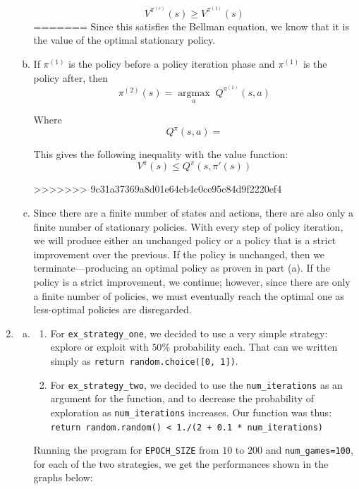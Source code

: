 \documentclass{article}
\begin{document}
\begin{enumerate}
\begin{enumerate}[(a)]
 $$V^{\pi^{(e)}}(s) \geq V^{\pi^{(1)}}(s)$$  
=======
                Since this satisfies the Bellman equation, we know that it is the value of the optimal stationary policy.
                
                \item If $\pi^{(1)}$ is the policy before a policy iteration phase and $\pi^{(1)}$ is the policy after, then $$\pi^{(2)}(s) = \underset{a}{\operatorname{argmax}} \; Q^{\pi^{(1)}}(s, a)$$

                Where $$Q^{\pi}(s, a) = $$

                This gives the following inequality with the value function: $$V^{\pi}(s) \leq Q^{\pi} (s, \pi'(s))$$

>>>>>>> 9c31a37369a8d01e64cb4c0ce95c84d9f2220ef4
                \item Since there are a finite number of states and actions, there are also only a finite number of stationary policies. With every step of policy iteration, we will produce either an unchanged policy or a policy that is a strict improvement over the previous. If the policy is unchanged, then we terminate---producing an optimal policy as proven in part (a). If the policy is a strict improvement, we continue; however, since there are only a finite number of policies, we must eventually reach the optimal one as less-optimal policies are disregarded.
            \end{enumerate}        
        \item
            \begin{enumerate}[(a)]
<<<<<<< HEAD
                \item 
                \begin{enumerate}[1.]
                	\item
			 For \texttt{ex\_strategy\_one}, we decided to use a very simple strategy: explore or exploit with $50\%$ probability each. That can we written simply as \texttt{return random.choice([0, 1])}. 
		\item
			 For \texttt{ex\_strategy\_two}, we decided to use the \texttt{num\_iterations} as an argument for the function, and to decrease the probability of exploration as \texttt{num\_iterations} increases. Our function was thus: \texttt{return random.random() < 1./(2 + 0.1 * num\_iterations)}\\
		  \end{enumerate}	 
			 Running the program for \texttt{EPOCH\_SIZE} from $10$ to $200$ and \texttt{num\_games=100}, for each of the two strategies, we get the performances shown in the graphs below:

\end{enumerate}
\end{enumerate}
\end{document}
